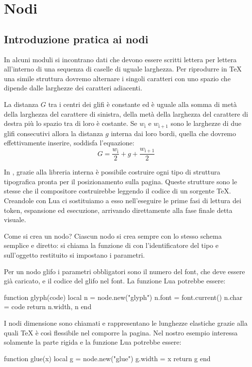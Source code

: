 

\chapter{Nodi}
\label{iiiChNodi}


\section{Introduzione pratica ai nodi}

In alcuni moduli si incontrano dati che devono essere scritti lettera per
lettera all'interno di una sequenza di caselle di uguale larghezza. Per
riprodurre in \TeX{} una simile struttura dovremo alternare i singoli caratteri
con uno spazio che dipende dalle larghezze dei caratteri adiacenti.

La distanza \( G \) tra i centri dei glifi è constante ed è uguale alla somma di
metà della larghezza del carattere di sinistra, della metà della larghezza del
carattere di destra più lo spazio tra di loro è costante. Se \(w_\mathrm{i} \) e
\(w_\mathrm{i+1} \) sono le larghezze di due glifi consecutivi allora la
distanza \( g \) interna dai loro bordi, quella che dovremo effettivamente
inserire, soddisfa l'equazione:
\[
    G = \frac{w_\mathrm{i}}{2} + g + \frac{w_\mathrm{i+1}}{2}
\]

In \LuaTeX, grazie alla libreria interna  è possibile costruire ogni
tipo di struttura tipografica pronta per il posizionamento sulla pagina. Queste
strutture sono le stesse che il compositore costruirebbe leggendo il codice di
un sorgente \TeX{}. Creandole con Lua ci sostituiamo a esso nell'eseguire le
prime fasi di lettura dei token, espansione ed esecuzione, arrivando
direttamente alla fase finale detta visuale.

Come si crea un nodo? Ciascun nodo si crea sempre con lo stesso schema semplice
e diretto: si chiama la funzione  di  con l'identificatore
del tipo e sull'oggetto restituito si impostano i parametri.

Per un nodo glifo i parametri obbligatori sono il numero del font, che deve
essere già caricato, e il codice del glifo nel font. La funzione Lua potrebbe
essere:
\begin{lines}
function glyph(code)
    local n = node.new("glyph")
    n.font = font.current()
    n.char = code
    return n.width, n
end
\end{lines}

I nodi dimensione sono chiamati  e rappresentano le lunghezze
elastiche grazie alla quali \TeX{} è così flessibile nel comporre la pagina. Nel
nostro esempio interessa solamente la parte rigida e la funzione Lua potrebbe
essere:
\begin{lines}
function glue(x)
    local g = node.new("glue")
    g.width = x
    return g
end
\end{lines}

